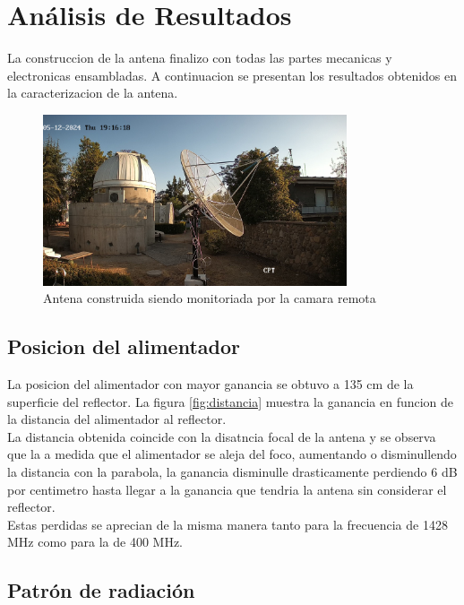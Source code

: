 \chapter{Análisis de Resultados}

La construccion de la antena finalizo con todas las partes mecanicas y electronicas ensambladas. A continuacion se presentan los resultados obtenidos en la caracterizacion de la antena.\\

\begin{figure}
    \centering
    \includegraphics[width=0.8\textwidth]{img/antenna}
    \caption{Antena construida siendo monitoriada por la camara remota}
    \label{fig:antena}
\end{figure}

\section{Posicion del alimentador}

La posicion del alimentador con mayor ganancia se obtuvo a 135 cm de la superficie del reflector. La figura \ref{fig:distancia} muestra la ganancia en funcion de la distancia del alimentador al reflector.\\

La distancia obtenida coincide con la disatncia focal de la antena y se observa que la a medida que el alimentador se aleja del foco, aumentando o disminullendo la distancia con la parabola, la ganancia disminulle drasticamente perdiendo 6 dB por centimetro hasta llegar a la ganancia que tendria la antena sin considerar el reflector.\\

Estas perdidas se aprecian de la misma manera tanto para la frecuencia de 1428 MHz como para la de 400 MHz.\\

\section{Patrón de radiación} \label{sec:patron}


